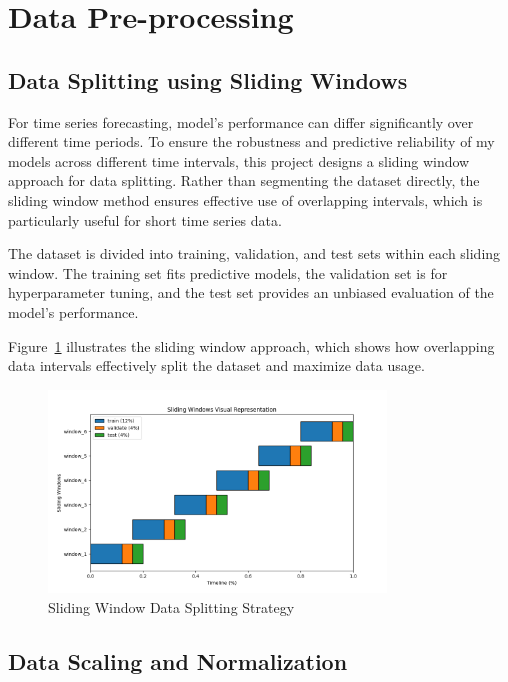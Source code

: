 \section{Data Pre-processing}

\subsection{Data Splitting using Sliding Windows}

For time series forecasting, model's performance can differ significantly over different time periods. To ensure the robustness and predictive reliability of my models across different time intervals, this project designs a sliding window approach for data splitting. Rather than segmenting the dataset directly, the sliding window method ensures effective use of overlapping intervals, which is particularly useful for short time series data.

The dataset is divided into training, validation, and test sets within each sliding window. The training set fits predictive models, the validation set is for hyperparameter tuning, and the test set provides an unbiased evaluation of the model's performance.

Figure~\ref{fig:sliding_windows} illustrates the sliding window approach, which shows how overlapping data intervals effectively split the dataset and maximize data usage.

\begin{figure}[h]
\centering
\includegraphics[width=0.8\textwidth]{figures/sliding_windows}
\caption{Sliding Window Data Splitting Strategy}
\label{fig:sliding_windows}
\end{figure}

\subsection{Data Scaling and Normalization}

